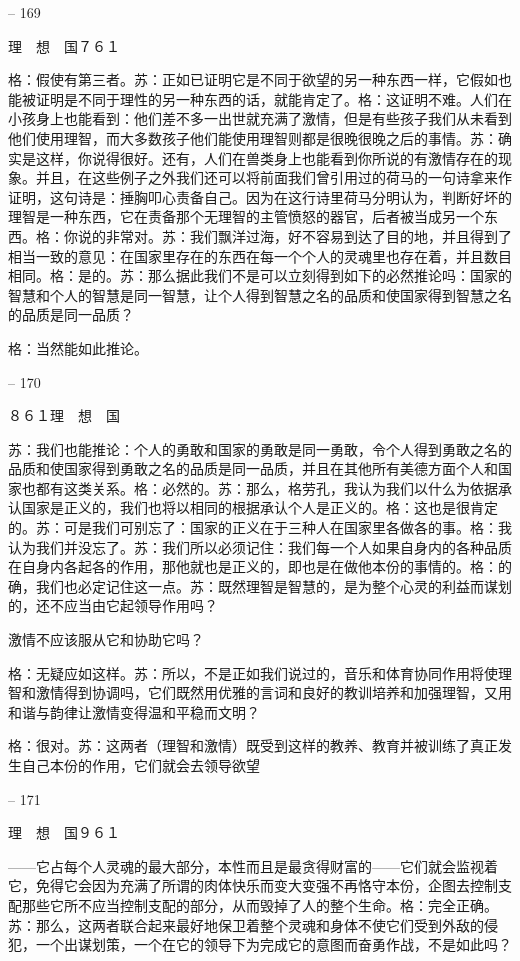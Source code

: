 \documentclass[11pt,oneside]{book}
\begin{document}
\begin{common-format}
    

-- 169

    理　想　国７６１

    格：假使有第三者。苏：正如已证明它是不同于欲望的另一种东西一样，它假如也能被证明是不同于理性的另一种东西的话，就能肯定了。格：这证明不难。人们在小孩身上也能看到：他们差不多一出世就充满了激情，但是有些孩子我们从未看到他们使用理智，而大多数孩子他们能使用理智则都是很晚很晚之后的事情。苏：确实是这样，你说得很好。还有，人们在兽类身上也能看到你所说的有激情存在的现象。并且，在这些例子之外我们还可以将前面我们曾引用过的荷马的一句诗拿来作证明，这句诗是：捶胸叩心责备自己。因为在这行诗里荷马分明认为，判断好坏的理智是一种东西，它在责备那个无理智的主管愤怒的器官，后者被当成另一个东西。格：你说的非常对。苏：我们飘洋过海，好不容易到达了目的地，并且得到了相当一致的意见：在国家里存在的东西在每一个个人的灵魂里也存在着，并且数目相同。格：是的。苏：那么据此我们不是可以立刻得到如下的必然推论吗：国家的智慧和个人的智慧是同一智慧，让个人得到智慧之名的品质和使国家得到智慧之名的品质是同一品质？

    格：当然能如此推论。

    

-- 170

    ８６１理　想　国

    苏：我们也能推论：个人的勇敢和国家的勇敢是同一勇敢，令个人得到勇敢之名的品质和使国家得到勇敢之名的品质是同一品质，并且在其他所有美德方面个人和国家也都有这类关系。格：必然的。苏：那么，格劳孔，我认为我们以什么为依据承认国家是正义的，我们也将以相同的根据承认个人是正义的。格：这也是很肯定的。苏：可是我们可别忘了：国家的正义在于三种人在国家里各做各的事。格：我认为我们并没忘了。苏：我们所以必须记住：我们每一个人如果自身内的各种品质在自身内各起各的作用，那他就也是正义的，即也是在做他本份的事情的。格：的确，我们也必定记住这一点。苏：既然理智是智慧的，是为整个心灵的利益而谋划的，还不应当由它起领导作用吗？

    激情不应该服从它和协助它吗？

    格：无疑应如这样。苏：所以，不是正如我们说过的，音乐和体育协同作用将使理智和激情得到协调吗，它们既然用优雅的言词和良好的教训培养和加强理智，又用和谐与韵律让激情变得温和平稳而文明？

    格：很对。苏：这两者（理智和激情）既受到这样的教养、教育并被训练了真正发生自己本份的作用，它们就会去领导欲望

    

-- 171

    理　想　国９６１

    ——它占每个人灵魂的最大部分，本性而且是最贪得财富的——它们就会监视着它，免得它会因为充满了所谓的肉体快乐而变大变强不再恪守本份，企图去控制支配那些它所不应当控制支配的部分，从而毁掉了人的整个生命。格：完全正确。苏：那么，这两者联合起来最好地保卫着整个灵魂和身体不使它们受到外敌的侵犯，一个出谋划策，一个在它的领导下为完成它的意图而奋勇作战，不是如此吗？


\end{common-format}
\end{document}
